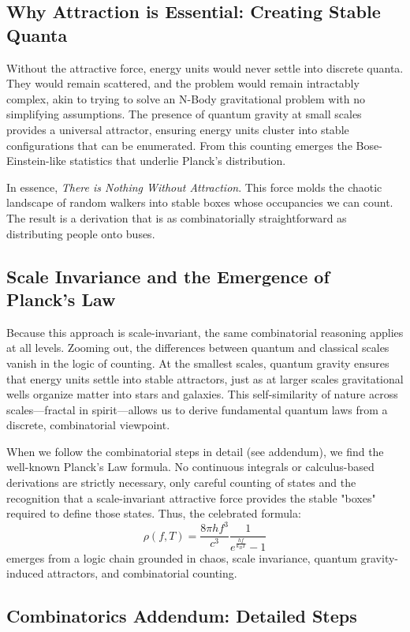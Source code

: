 \documentclass{article}
\begin{document}
\subsection*{Why Attraction is Essential: Creating Stable Quanta}

Without the attractive force, energy units would never settle into discrete quanta. They would remain scattered, and the problem would remain intractably complex, akin to trying to solve an N-Body gravitational problem with no simplifying assumptions. The presence of quantum gravity at small scales provides a universal attractor, ensuring energy units cluster into stable configurations that can be enumerated. From this counting emerges the Bose-Einstein-like statistics that underlie Planck’s distribution.

In essence, \emph{There is Nothing Without Attraction}. This force molds the chaotic landscape of random walkers into stable boxes whose occupancies we can count. The result is a derivation that is as combinatorially straightforward as distributing people onto buses.

\subsection*{Scale Invariance and the Emergence of Planck’s Law}

Because this approach is scale-invariant, the same combinatorial reasoning applies at all levels. Zooming out, the differences between quantum and classical scales vanish in the logic of counting. At the smallest scales, quantum gravity ensures that energy units settle into stable attractors, just as at larger scales gravitational wells organize matter into stars and galaxies. This self-similarity of nature across scales—fractal in spirit—allows us to derive fundamental quantum laws from a discrete, combinatorial viewpoint.

When we follow the combinatorial steps in detail (see addendum), we find the well-known Planck’s Law formula. No continuous integrals or calculus-based derivations are strictly necessary, only careful counting of states and the recognition that a scale-invariant attractive force provides the stable "boxes" required to define those states. Thus, the celebrated formula:
\[
\rho(f,T) = \frac{8 \pi h f^3}{c^3} \frac{1}{e^{\frac{hf}{k_B T}} - 1}
\]
emerges from a logic chain grounded in chaos, scale invariance, quantum gravity-induced attractors, and combinatorial counting.

\subsection*{Combinatorics Addendum: Detailed Steps}
\end{document}
